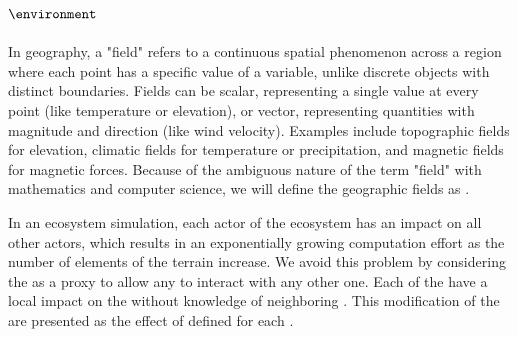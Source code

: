 


\subsection{ $\environment$}
\label{sec:semantic-representation_communication}

In geography, a "field" refers to a continuous spatial phenomenon across a region where each point has a specific value of a variable, unlike discrete objects with distinct boundaries. Fields can be scalar, representing a single value at every point (like temperature or elevation), or vector, representing quantities with magnitude and direction (like wind velocity). Examples include topographic fields for elevation, climatic fields for temperature or precipitation, and magnetic fields for magnetic forces. Because of the ambiguous nature of the term "field" with mathematics and computer science, we will define the geographic fields as .

In an ecosystem simulation, each actor of the ecosystem has an impact on all other actors, which results in an exponentially growing computation effort as the number of elements of the terrain increase. We avoid this problem by considering the  as a proxy to allow any  to interact with any other one. Each of the  have a local impact on the  without knowledge of neighboring . This modification of the  are presented as the effect of  defined for each . %

